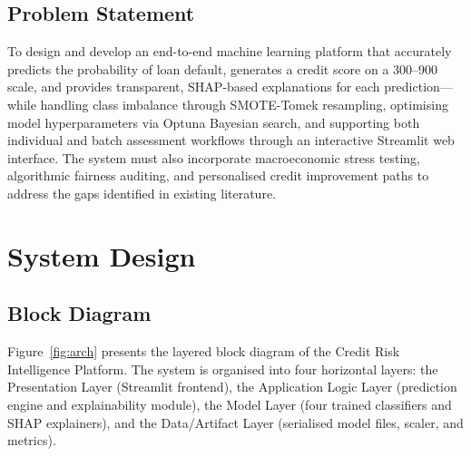 \documentclass[12pt,a4paper]{report}
\begin{document}
\section{Problem Statement}

To design and develop an end-to-end machine learning platform that accurately predicts the probability of loan default, generates a credit score on a 300--900 scale, and provides transparent, SHAP-based explanations for each prediction---while handling class imbalance through SMOTE-Tomek resampling, optimising model hyperparameters via Optuna Bayesian search, and supporting both individual and batch assessment workflows through an interactive Streamlit web interface. The system must also incorporate macroeconomic stress testing, algorithmic fairness auditing, and personalised credit improvement paths to address the gaps identified in existing literature.


\chapter{System Design}

\section{Block Diagram}

Figure~\ref{fig:arch} presents the layered block diagram of the Credit Risk Intelligence Platform. The system is organised into four horizontal layers: the Presentation Layer (Streamlit frontend), the Application Logic Layer (prediction engine and explainability module), the Model Layer (four trained classifiers and SHAP explainers), and the Data/Artifact Layer (serialised model files, scaler, and metrics).
\end{document}
